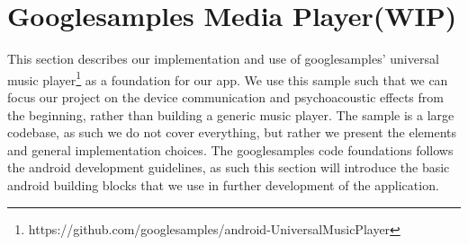 







\section{Googlesamples Media Player(WIP)}
This section describes our implementation and use of googlesamples' universal music player\footnote{https://github.com/googlesamples/android-UniversalMusicPlayer} as a foundation for our app.
We use this sample such that we can focus our project on the device communication and psychoacoustic effects from the beginning, rather than building a generic music player.
The sample is a large codebase, as such we do not cover everything, but rather we present the elements and general implementation choices.
The googlesamples code foundations follows the android development guidelines, as such this section will introduce the basic android building blocks that we use in further development of the application.

